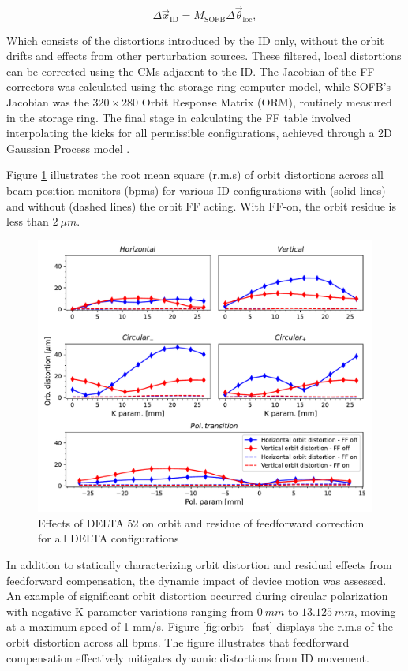 \documentclass[a4paper,
               keeplastbox,   %
               ]{jacow}
\begin{document}
\begin{equation}
    \Delta\vec{x}_{\text{ID}} = M_{\text{SOFB}}\Delta\vec{\theta}_{\text{loc}},
\end{equation}

Which consists of the distortions introduced by the ID only, without the orbit drifts and effects from other perturbation sources. These filtered, local distortions can be corrected using the CMs adjacent to the ID. The Jacobian of the FF correctors was calculated using the storage ring computer model, while  SOFB's Jacobian was the  $320\times 280$ Orbit Response Matrix (ORM), routinely measured in the storage ring.  The final stage in calculating the FF table involved interpolating the kicks for all permissible configurations, achieved through a 2D Gaussian Process model \cite{Gaussian}.  

Figure \ref{fig:orbit_slow} illustrates the root mean square (r.m.s) of orbit distortions across all beam position monitors (bpms) for various ID configurations with (solid lines) and without (dashed lines) the orbit FF acting. With FF-on,  the orbit residue is less than $\SI{2}{\mu m}$.

\begin{figure}[!h]
    \centering
   \includegraphics[width=\columnwidth]{Orbit_dist.pdf}
   \caption{Effects of DELTA 52 on orbit and residue of feedforward correction for all DELTA configurations}
   \label{fig:orbit_slow}
\end{figure}

In addition to statically characterizing orbit distortion and residual effects from feedforward compensation, the dynamic impact of device motion was assessed. An example of significant orbit distortion occurred during circular polarization with negative K parameter variations ranging from $\SI{0}{mm}$ to $\SI{13.125}{mm}$, moving at a maximum speed of 1 mm/s. Figure \ref{fig:orbit_fast} displays the r.m.s of the orbit distortion across all bpms. The figure illustrates that feedforward compensation effectively mitigates dynamic distortions from ID movement.
\end{document}
